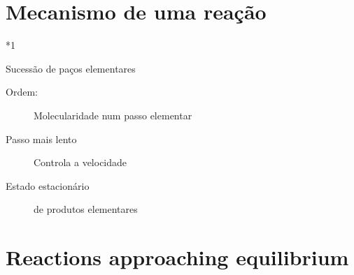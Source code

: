 \documentclass[\mainfilename]{subfiles}
\begin{document}
\part*{Mecanismo de uma reação}
\begin{sectionBox}*1{} %
    
    Sucessão de paços elementares

    \begin{description}
       \item[Ordem:] Molecularidade num passo elementar
       \item[Passo mais lento] Controla a velocidade
       \item[Estado estacionário] de produtos elementares 
    \end{description}
    
\end{sectionBox}

\part*{Reactions approaching equilibrium}
\end{document}
